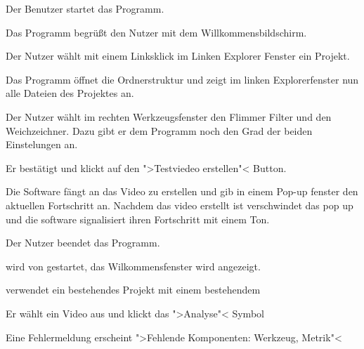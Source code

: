   \begin{compactenum}[1]
\item Der Benutzer startet das Programm.
\item Das Programm begrüßt den Nutzer mit dem Willkommensbildschirm.
\item Der Nutzer wählt mit einem Linksklick im Linken Explorer Fenster ein Projekt.
\item Das Programm öffnet die Ordnerstruktur und zeigt im linken Explorerfenster nun alle Dateien des Projektes an.
\item Der Nutzer wählt im rechten Werkzeugsfenster den Flimmer Filter und den Weichzeichner. Dazu gibt er dem Programm noch den Grad der beiden Einstelungen an.
\item Er bestätigt und klickt auf den ">Testviedeo erstellen"< Button.
\item Die Software fängt an das Video zu erstellen und gib in einem Pop-up fenster den aktuellen Fortschritt an. Nachdem das video erstellt ist verschwindet das pop up und die software signalisiert ihren Fortschritt mit einem Ton.
\item Der Nutzer beendet das Programm.
\end{compactenum}

\begin{compactenum}[1]
\item \projektTitel wird von \dAU gestartet, das Wilkommensfenster wird angezeigt.
\item \dAU verwendet ein bestehendes Projekt mit einem bestehendem 
\item Er wählt ein Video aus und klickt das ">Analyse"< Symbol
\item Eine Fehlermeldung erscheint ">Fehlende Komponenten: Werkzeug, Metrik"<
\end{compactenum}